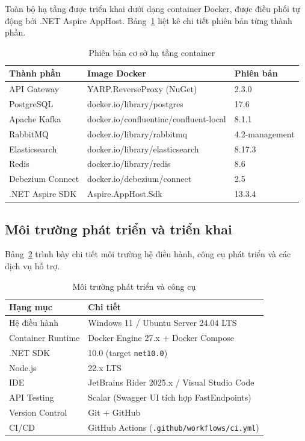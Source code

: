Toàn bộ hạ tầng được triển khai dưới dạng container Docker, được điều phối tự động bởi .NET Aspire AppHost. Bảng~\ref{tab:infra_versions} liệt kê chi tiết phiên bản từng thành phần.

\begin{table}[H]
\centering
\caption{Phiên bản cơ sở hạ tầng container}
\label{tab:infra_versions}
\renewcommand{\arraystretch}{1.3}
\begin{tabularx}{\textwidth}{|l|X|l|}
\hline
\textbf{Thành phần} & \textbf{Image Docker} & \textbf{Phiên bản} \\
\hline
API Gateway & YARP.ReverseProxy (NuGet) & 2.3.0 \\
\hline
PostgreSQL & docker.io/library/postgres & 17.6 \\
\hline
Apache Kafka & docker.io/confluentinc/confluent-local & 8.1.1 \\
\hline
RabbitMQ & docker.io/library/rabbitmq & 4.2-management \\
\hline
Elasticsearch & docker.io/library/elasticsearch & 8.17.3 \\
\hline
Redis & docker.io/library/redis & 8.6 \\
\hline
Debezium Connect & docker.io/debezium/connect & 2.5 \\
\hline
.NET Aspire SDK & Aspire.AppHost.Sdk & 13.3.4 \\
\hline
\end{tabularx}
\end{table}

\subsection{Môi trường phát triển và triển khai}
\label{subsec:moi_truong_phat_trien}

Bảng~\ref{tab:dev_env} trình bày chi tiết môi trường hệ điều hành, công cụ phát triển và các dịch vụ hỗ trợ.

\begin{table}[H]
\centering
\caption{Môi trường phát triển và công cụ}
\label{tab:dev_env}
\renewcommand{\arraystretch}{1.3}
\begin{tabularx}{\textwidth}{|l|X|}
\hline
\textbf{Hạng mục} & \textbf{Chi tiết} \\
\hline
Hệ điều hành & Windows 11 / Ubuntu Server 24.04 LTS \\
\hline
Container Runtime & Docker Engine 27.x + Docker Compose \\
\hline
.NET SDK & 10.0 (target \texttt{net10.0}) \\
\hline
Node.js & 22.x LTS \\
\hline
IDE & JetBrains Rider 2025.x / Visual Studio Code \\
\hline
API Testing & Scalar (Swagger UI tích hợp FastEndpoints) \\
\hline
Version Control & Git + GitHub \\
\hline
CI/CD & GitHub Actions (\texttt{.github/workflows/ci.yml}) \\
\hline
\end{tabularx}
\end{table}

